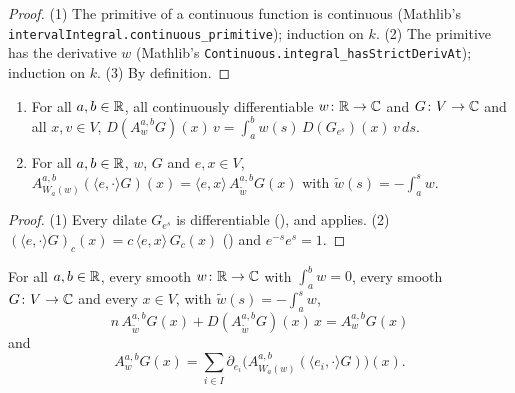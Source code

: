 \begin{proof}
\leanok
(1) The primitive of a continuous function is continuous (Mathlib's
\texttt{intervalIntegral.\allowbreak continuous\_\allowbreak primitive}); induction on $k$.
(2) The primitive has the derivative $w$ (Mathlib's
\texttt{Continuous.\allowbreak integral\_\allowbreak hasStrictDerivAt}); induction on $k$.
(3) By definition.
\end{proof}

\begin{lemma}
\label{lem:weighted-dilation-derivative}
\leanok
{}
\begin{enumerate}
  \item For all $a, b \in \mathbb{R}$, all continuously differentiable $w \colon \mathbb{R} \to \mathbb{C}$ and
    $G \colon V \to \mathbb{C}$ and all $x, v \in V$,
    $D(A^{a,b}_w G)(x) \, v = \int_a^b w(s) \, D(G_{e^s})(x) \, v \, ds$.
  \item For all $a, b \in \mathbb{R}$, $w$, $G$ and $e, x \in V$,
    $A^{a,b}_{W_a(w)} (\langle e, \cdot \rangle G)(x)
      = \langle e, x \rangle \, A^{a,b}_{\tilde w} G(x)$ with $\tilde w(s) = -\int_a^s w$.
\end{enumerate}
\end{lemma}

\begin{proof}
\leanok
(1) Every dilate $G_{e^s}$ is differentiable (), and
 applies. (2) $(\langle e, \cdot \rangle G)_c(x)
= c \, \langle e, x \rangle \, G_c(x)$ () and
$e^{-s} e^s = 1$.
\end{proof}

\begin{theorem}
\label{thm:weighted-dilation-divergence}
\leanok
{}
For all $a, b \in \mathbb{R}$, every smooth $w \colon \mathbb{R} \to \mathbb{C}$ with $\int_a^b w = 0$, every smooth
$G \colon V \to \mathbb{C}$ and every $x \in V$, with $\tilde w(s) = -\int_a^s w$,
\[
  n \, A^{a,b}_{\tilde w} G(x) + D(A^{a,b}_{\tilde w} G)(x) \, x = A^{a,b}_w G(x)
\]
and
\[
  A^{a,b}_w G(x) = \sum_{i \in I} \partial_{e_i} \bigl(A^{a,b}_{W_a(w)}
    (\langle e_i, \cdot \rangle G)\bigr)(x) .
\]
\end{theorem}

